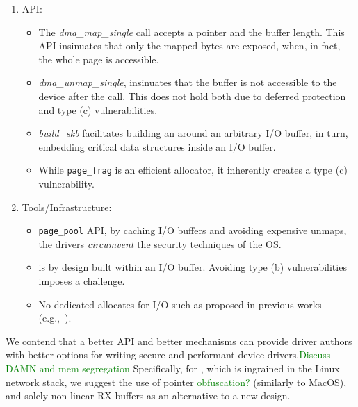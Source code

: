 \begin{enumerate}
    \item API: 
    \begin{itemize}[wide, labelwidth=!, labelindent=0pt]
        \item The \textit{dma\_map\_single} call accepts a pointer and the buffer length. This API insinuates that only the mapped bytes are exposed, when, in fact, the whole page is accessible.
        \item \textit{dma\_unmap\_single}, insinuates that the buffer is not accessible to the device after the call. This does not hold both due to deferred protection and type (c) \subpage{} vulnerabilities.
        \item \textit{build\_skb} facilitates building an \skb{} around an arbitrary I/O buffer, in turn, embedding critical data structures inside an I/O buffer.
        \item While \texttt{page\_frag} is an efficient allocator, it inherently creates a type (c) \subpage{} vulnerability.
    \end{itemize} 
    \item Tools/Infrastructure: 
    \begin{itemize}[wide, labelwidth=!, labelindent=0pt]
            \item \texttt{page\_pool} API, by caching I/O buffers and avoiding expensive unmaps, the drivers \emph{circumvent} the security techniques of the OS. 
            \item \shinfo{} is by design built within an I/O buffer. Avoiding type (b) \subpage{} vulnerabilities imposes a challenge.
            \item No dedicated allocates for I/O such as proposed in previous works (e.g.,~\cite{MSMT18,MMT16}).
    \end{itemize}
\end{enumerate}

We contend that a better API and better mechanisms can provide driver authors with better options for writing secure and performant device drivers.\textcolor{green}{Discuss DAMN and mem segregation} Specifically, for \shinfo{}, which is ingrained in the Linux network stack, we suggest the use of pointer \textcolor{green}{obfuscation?} (similarly to MacOS), and solely non-linear RX buffers as an alternative to a new design. 

